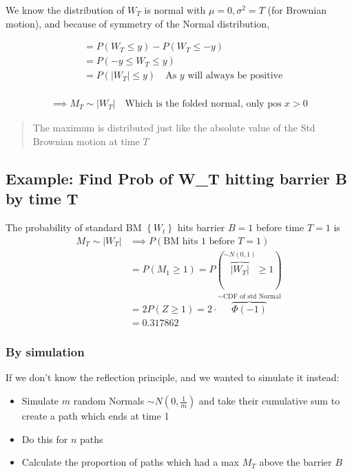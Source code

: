 \documentclass[
  oneside]{book}
\providecommand{\tightlist}{%
  \setlength{\itemsep}{0pt}\setlength{\parskip}{0pt}}
\begin{document}
We know the distribution of \(W_{T}\) is normal with \(\mu=0, \sigma^{2}=T\) (for Brownian motion), and because of symmetry of the Normal distribution,

\[
\begin{aligned}
&= P(W_{T}\leq y)-P(W_{T}\leq -y)\\
&= P(-y\leq W_{T} \leq y)\\
&= P(|W_{T}| \leq y) \quad \text{As $y$ will always be positive}\\
\end{aligned}
\]

\[
\begin{gathered}
\implies M_{T} \sim |W_{T}| \quad \text{Which is the folded normal, only pos } x>0
\end{gathered}
\]

\begin{quote}
The maximum is distributed just like the absolute value of the Std Brownian motion at time \(T\)
\end{quote}

\hypertarget{example-find-prob-of-w_t-hitting-barrier-b-by-time-t}{%
\subsection{Example: Find Prob of W\_T hitting barrier B by time T}\label{example-find-prob-of-w_t-hitting-barrier-b-by-time-t}}

The probability of standard BM \(\left\{ W_{t} \right\}\) hits barrier \(B=1\) before time \(T=1\) is
\[
\begin{aligned}
M_{T} \sim |W_{T}| &\implies P(\text{BM hits 1 before } T=1)\\
&= P(M_{1}\geq 1) = P(\overbrace{ |W_{T}| }^{ \sim N(0,1) } \geq 1)\\
&= 2 P(Z \geq 1) = 2 \cdot\overbrace{ \Phi(-1) }^{ \sim \text{CDF of std Normal} }\\
&= 0.317862
\end{aligned}
\]

\hypertarget{by-simulation}{%
\subsubsection{By simulation}\label{by-simulation}}

If we don't know the reflection principle, and we wanted to simulate it instead:

\begin{itemize}
\tightlist
\item
  Simulate \(m\) random Normals \(\sim N\left( 0, \frac{1}{m} \right)\) and take their cumulative sum to create a path which ends at time 1
\item
  Do this for \(n\) paths
\item
  Calculate the proportion of paths which had a max \(M_{T}\) above the barrier \(B\)
\end{itemize}
\end{document}
